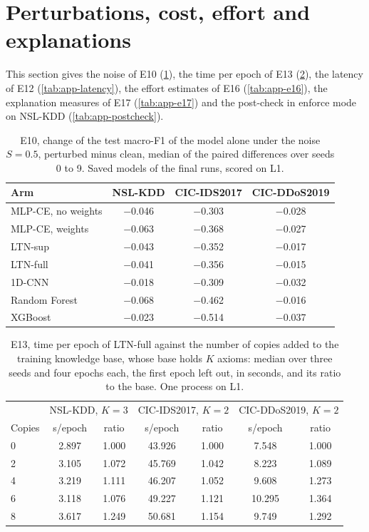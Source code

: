 \FloatBarrier
\section{Perturbations, cost, effort and explanations}

This section gives the noise of E10 (\cref{tab:app-e10}), the time per epoch of E13 (\cref{tab:app-e13}),
the latency of E12 (\cref{tab:app-latency}), the effort estimates of E16 (\cref{tab:app-e16}), the
explanation measures of E17 (\cref{tab:app-e17}) and the post-check in enforce mode on NSL-KDD
(\cref{tab:app-postcheck}).


\begin{table}[htbp]
\centering
\footnotesize
\caption{E10, change of the test macro-F1 of the model alone under the noise $S=0.5$, perturbed minus clean, median of
the paired differences over seeds 0 to 9. Saved models of the final runs, scored on L1.}
\label{tab:app-e10}
\setlength{\tabcolsep}{4pt}
\begin{tabular}{@{}lccc@{}}
\toprule
Arm & NSL-KDD & CIC-IDS2017 & CIC-DDoS2019 \\
\midrule
MLP-CE, no weights & $-$0.046 & $-$0.303 & $-$0.028 \\
MLP-CE, weights    & $-$0.063 & $-$0.368 & $-$0.027 \\
LTN-sup            & $-$0.043 & $-$0.352 & $-$0.017 \\
LTN-full           & $-$0.041 & $-$0.356 & $-$0.015 \\
1D-CNN             & $-$0.018 & $-$0.309 & $-$0.032 \\
Random Forest      & $-$0.068 & $-$0.462 & $-$0.016 \\
XGBoost            & $-$0.023 & $-$0.514 & $-$0.037 \\
\bottomrule
\end{tabular}
\end{table}

\begin{table}[htbp]
\centering
\footnotesize
\caption{E13, time per epoch of LTN-full against the number of copies added to the training knowledge base, whose base
holds $K$ axioms: median over three seeds and four epochs each, the first epoch left out, in seconds, and its ratio to
the base. One process on L1.}
\label{tab:app-e13}
\setlength{\tabcolsep}{4pt}
\begin{tabular}{@{}lcccccc@{}}
\toprule
 & \multicolumn{2}{c}{NSL-KDD, $K=3$} & \multicolumn{2}{c}{CIC-IDS2017, $K=2$} & \multicolumn{2}{c}{CIC-DDoS2019, $K=2$} \\
Copies & s/epoch & ratio & s/epoch & ratio & s/epoch & ratio \\
\midrule
0 & 2.897 & 1.000 & 43.926 & 1.000 & 7.548  & 1.000 \\
2 & 3.105 & 1.072 & 45.769 & 1.042 & 8.223  & 1.089 \\
4 & 3.219 & 1.111 & 46.207 & 1.052 & 9.608  & 1.273 \\
6 & 3.118 & 1.076 & 49.227 & 1.121 & 10.295 & 1.364 \\
8 & 3.617 & 1.249 & 50.681 & 1.154 & 9.749  & 1.292 \\
\bottomrule
\end{tabular}
\end{table}

